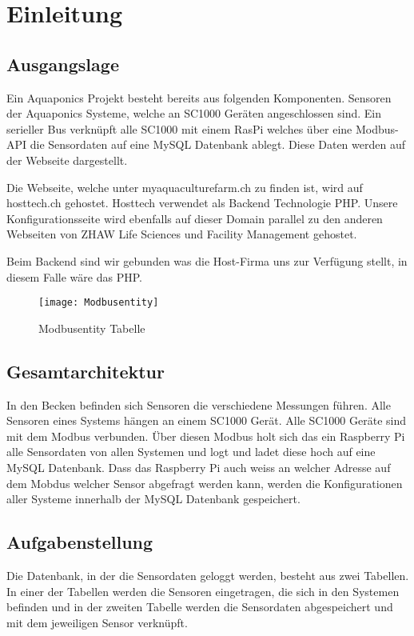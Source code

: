 \documentclass[../main.tex]{subfiles}
\begin{document}
	\section{Einleitung}
	
	\subsection{Ausgangslage}
	Ein Aquaponics Projekt besteht bereits aus folgenden Komponenten. Sensoren der Aquaponics Systeme, welche an SC1000 Geräten angeschlossen sind. 
	Ein serieller Bus verknüpft alle SC1000 mit einem RasPi welches über eine Modbus-API die Sensordaten auf eine MySQL Datenbank ablegt. Diese Daten werden auf der Webseite dargestellt.
	
	
	Die Webseite, welche unter myaquaculturefarm.ch zu finden ist, wird auf hosttech.ch gehostet. Hosttech verwendet als Backend Technologie PHP.
	Unsere Konfigurationsseite wird ebenfalls auf dieser Domain parallel zu den anderen Webseiten von ZHAW Life Sciences und Facility Management gehostet.
	
	Beim Backend sind wir gebunden was die Host-Firma uns zur Verfügung stellt, in diesem Falle wäre das PHP.
	
	\begin{figure}[h]
		\centering
		\texttt{[image: Modbusentity]}
		\caption{Modbusentity Tabelle}
		\label{fig:Modbusentity}
	\end{figure}

	\subsection{Gesamtarchitektur}
	In den Becken befinden sich Sensoren die verschiedene Messungen führen. Alle Sensoren eines Systems hängen an einem SC1000 Gerät. Alle SC1000 Geräte sind mit dem Modbus verbunden. Über diesen Modbus holt sich das ein Raspberry Pi alle Sensordaten von allen Systemen und logt und ladet diese hoch auf eine MySQL Datenbank. Dass das Raspberry Pi auch weiss an welcher Adresse auf dem Mobdus welcher Sensor abgefragt werden kann, werden die Konfigurationen aller Systeme innerhalb der MySQL Datenbank gespeichert.
	
	\subsection{Aufgabenstellung}
	Die Datenbank, in der die Sensordaten geloggt werden, besteht aus zwei Tabellen. In einer der Tabellen werden die Sensoren eingetragen, die sich in den Systemen befinden und in der zweiten Tabelle werden die Sensordaten abgespeichert und mit dem jeweiligen Sensor verknüpft.
	
\end{document}
